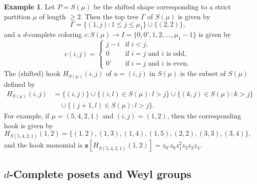 \documentclass[10pt]{amsart}
\theoremstyle{definition}
\newtheorem{exam}[theo]{Example}
\theoremstyle{remark}
\newcommand\vectz{\boldsymbol{z}}
\begin{document}
\begin{exam}
\label{ex:shifted_hc}
Let $P = S(\mu)$ be the shifted shape corresponding to a strict partition $\mu$ of length $\ge 2$.
Then the top tree $\Gamma$ of $S(\mu)$ is given by
$$
\Gamma = \{ (1,j) : 1 \le j \le \mu_1 \} \cup \{ (2, 2) \},
$$
and a $d$-complete coloring $c : S(\mu) \to I = \{ 0, 0', 1, 2, \dots, \mu_1 - 1 \}$ is given by
$$
c(i,j)
 =
\begin{cases}
 j-i &\text{if $i < j$,} \\
 0 &\text{if $i=j$ and $i$ is odd,} \\
 0' &\text{if $i=j$ and $i$ is even.}
\end{cases}
$$
The (shifted) hook $H_{S(\mu)}(i,j)$ of $u = (i,j)$ in $S(\mu)$ is the subset of $S(\mu)$ defined by
\begin{align*}
H_{S(\mu)}(i,j)
 &=
\{ (i,j) \}
\cup
\{ (i,l) \in S(\mu) : l > j \}
\cup
\{ (k,j) \in S(\mu) : k > j \}
\\
&\quad
\cup
\{ (j+1,l) \in S(\mu) : l > j \}.
\end{align*}
For example, if $\mu = (5,4,2,1)$ and $(i,j) = (1,2)$, then the corresponding hook is given by
$$
H_{S(5,4,2,1)}(1,2)
 =
\{ (1,2), (1,3), (1,4), (1,5), (2,2), (3,3), (3,4) \},
$$
and the hook monomial is 
$\vectz[H_{S(5,4,2,1)}(1,2)]= z_{0'}z_{0} z_1^2 z_2 z_3 z_4$.
\end{exam}

\subsection{%
\texorpdfstring{$d$}{d}-Complete posets and Weyl groups
}\label{subsec2.2}
\end{document}
